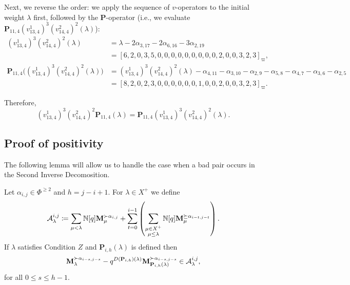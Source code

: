 \begin{example}
\medskip
\noindent Next, we reverse the order: we apply the sequence of $v$-operators to the initial weight $\lambda$ first, followed by the $\mathbf{P}$-operator (i.e., we evaluate $\mathbf{P}_{11,4}(v^1_{13,4})^3(v^{2}_{14,4})^2(\lambda)$):
\begin{equation}
\begin{aligned}
    (v^1_{13,4})^3(v^{2}_{14,4})^2(\lambda) &= \lambda - 2\alpha_{3,17}- 2\alpha_{6,16}- 3\alpha_{2,19} \\
    &= [6, 2, 0, 3, 5, 0, 0, 0, 0, 0, 0, 0, 0, 0, 2, 0, 0, 3, 2, 3]_\varpi, \\[5pt]
    \mathbf{P}_{11,4}\Big((v^1_{13,4})^3(v^{2}_{14,4})^2(\lambda)\Big) &= (v^1_{13,4})^3(v^{2}_{14,4})^2(\lambda) - \alpha_{4,11} - \alpha_{3,10} - \alpha_{2,9}  - \alpha_{5,8} - \alpha_{4,7} - \alpha_{3,6} - \alpha_{2,5} \\
    &= [8, 2, 0, 2, 3, 0, 0, 0, 0, 0, 0, 1, 0, 0, 2, 0, 0, 3, 2, 3]_\varpi.
\end{aligned}
\end{equation}

Therefore, 
\[
    (v^1_{13,4})^3(v^{2}_{14,4})^2\mathbf{P}_{11,4}(\lambda) = \mathbf{P}_{11,4}(v^1_{13,4})^3(v^{2}_{14,4})^2(\lambda).
\] 
\end{example}


\subsection{Proof of positivity}  \label{section proof of positivity}

The following lemma will allow us to handle the case when a bad pair occurs in the Second Inverse Decomosition. 

\begin{lemma} \label{lem: GranLemma}
    Let $\alpha_{i,j} \in \Phi^{\geq 2} $ and  $h=j-i+1$.
    For $\lambda \in X^{+}$ we define
    \begin{equation}
       \mathcal{A}_\lambda^{i,j} \coloneqq \sum_{\mu< \lambda}  \mathbb{N}[q] \mathbf{M}_{\mu}^{\succ\alpha_{i,j}}+
         \sum_{t=0}^{i-1} \left( \sum_{\substack{\mu \in X^+ \\\mu\leq  \lambda}}\mathbb{N}[q]\mathbf{M}_{\mu}^{\succeq \alpha_{i-t,j-t}} \right). 
    \end{equation}
If  $\lambda$ satisfies Condition $Z$ and  $\mathbf{P}_{i,h}(\lambda)$ is defined then
\begin{equation} \label{eq: DIFF}
    \mathbf{M}_{\lambda}^{\succ \alpha_{i-s,j-s}} - q^{D(\mathbf{P}_{i,h} )(\lambda)}  \mathbf{M}_{\mathbf{P}_{i,h}(\lambda)}^{\succ \alpha_{i-s,j-s}} \in  \mathcal{A}_\lambda^{i,j},
\end{equation}
for all $ 0\leq s \leq h-1  $. 
\end{lemma}



